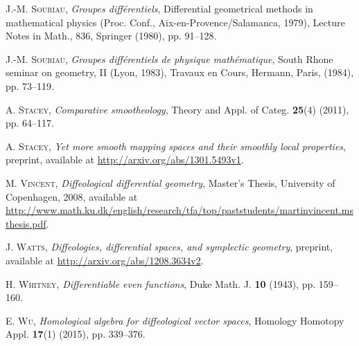 \documentclass[12pt]{amsart}
\theoremstyle{remark}
\begin{document}
\begin{thebibliography}{CSW}

     {\scshape J.-M. Souriau},
    \emph{Groupes diff\'erentiels},
    Differential geometrical methods in mathematical physics
    (Proc. Conf., Aix-en-Provence/Salamanca, 1979),
    Lecture Notes in Math., 836, Springer (1980), pp. 91--128.

     {\scshape J.-M. Souriau},
    \emph{Groupes diff\'erentiels de physique math\'ematique},
    South Rhone seminar on geometry, II (Lyon, 1983),
    Travaux en Cours, Hermann, Paris, (1984), pp. 73--119.


     {\scshape A. Stacey},
    \emph{Comparative smootheology},
    Theory and Appl. of Categ. \textbf{25}(4) (2011), pp. 64--117.

     {\scshape A. Stacey},
    \emph{Yet more smooth mapping spaces and their smoothly local properties},
    preprint, available at \url{http://arxiv.org/abs/1301.5493v1}.


     {\scshape M. Vincent},
    \emph{Diffeological differential geometry},
    Master's Thesis, University of Copenhagen, 2008,
    available at
    \url{http://www.math.ku.dk/english/research/tfa/top/paststudents/martinvincent.msthesis.pdf}.


     {\scshape J. Watts},
    \emph{Diffeologies, differential spaces, and symplectic geometry},
    preprint, available at \url{http://arxiv.org/abs/1208.3634v2}.

%
%
%

     {\scshape H. Whitney},
    \emph{Differentiable even functions},
    Duke Math. J. \textbf{10} (1943), pp. 159--160.

     {\scshape E. Wu},
    \emph{Homological algebra for diffeological vector spaces},
    Homology Homotopy Appl. \textbf{17}(1) (2015), pp. 339--376.

\end{thebibliography}
\vspace*{10pt} %
\end{document}
